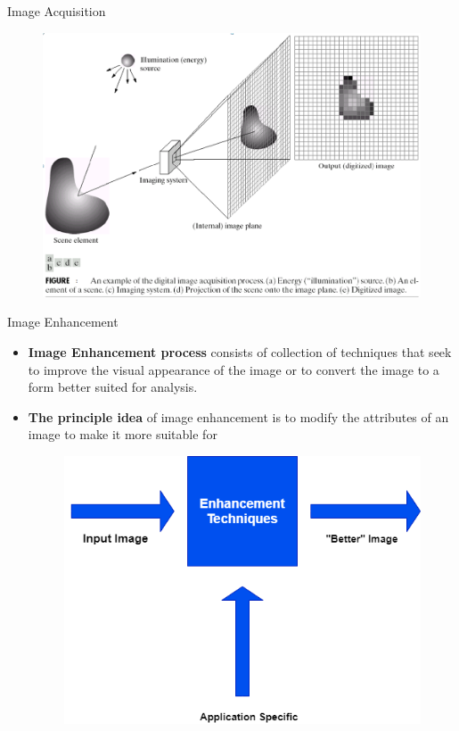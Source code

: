 \documentclass[12pt]{beamer}
\begin{document}
\begin{frame}{Image Acquisition}
\begin{figure}[H]
\begin{center}
\includegraphics[scale=0.4]{acq.png}
\end{center}
\end{figure}
\end{frame}


\begin{frame}{Image Enhancement}
\begin{itemize}
\item \textbf{Image Enhancement process} consists of collection of techniques that seek to improve the visual appearance of the image or to convert the image to a form better suited for analysis.

\item \textbf{The principle idea} of image enhancement is to modify the attributes of an image to make it more suitable for 

\begin{figure}[H]
\begin{center}
\includegraphics[scale=0.3]{enh.png}
\end{center}
\end{figure}
\end{itemize}
\end{frame}
\end{document}
